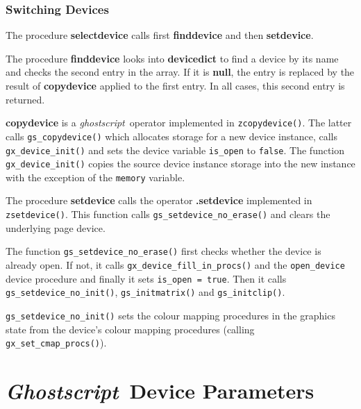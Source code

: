 \documentclass[twoside,a4paper]{article}
\newcommand{\gs}{\textit{ghostscript\/}}
\newcommand{\Gs}{\textit{Ghostscript\/}}
\newcommand{\ps}[1]{{\sffamily\bfseries #1}}	%
\newcommand{\prog}[1]{\texttt{#1}}
\newif\ifdraft \draftfalse
\begin{document}

\subsubsection{Switching Devices}

The procedure \ps{selectdevice} calls first \ps{finddevice} and then
\ps{setdevice}.	%

The procedure \ps{finddevice} looks into \ps{devicedict} to find a device by
its name and checks the second entry in the array.
If it is \ps{null},
the entry is replaced by the result of \ps{copydevice} applied to the first
entry.
In all cases, this second entry is returned.

\ifdraft
??? TEST: What happens on multiple selection?
\fi

\ps{copydevice} is a \gs\ operator implemented in \prog{zcopydevice()}.
The latter calls \prog{gs\_copydevice()}	%
which allocates storage for a new device instance,
calls \prog{gx\_device\_init()} and sets the device variable \prog{is\_open}
to \prog{false}.
The function \prog{gx\_device\_init()} copies the source device instance
storage into the new instance with the exception of the \prog{memory} variable.

The procedure \ps{setdevice} calls the operator \ps{.setdevice} implemented
in \prog{zsetdevice()}.	%
This function calls \prog{gs\_setdevice\_no\_erase()} and clears the
underlying page device.	%

\ifdraft
??? What happens with the old device?
\fi

The function \prog{gs\_setdevice\_no\_erase()} first checks whether the device
is already open.
If not, it calls \prog{gx\_device\_fill\_in\_procs()} and the
\prog{open\_device} device procedure and finally it sets \prog{is\_open = true}.
Then it calls \prog{gs\_setdevice\_no\_init()}, \prog{gs\_initmatrix()} and
\prog{gs\_initclip()}.

\prog{gs\_setdevice\_no\_init()} sets the colour mapping procedures
in the graphics state from the device's colour mapping procedures
(calling \prog{gx\_set\_cmap\_procs()}).


\section{\Gs\ Device Parameters}
\end{document}
